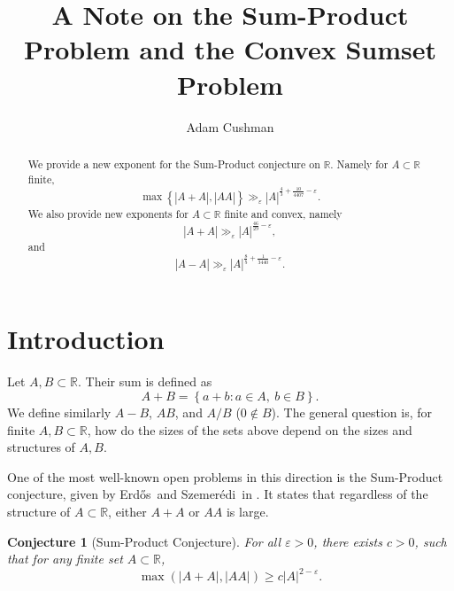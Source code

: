 \documentclass[reqno]{amsart}
\newcommand{\erdos}{Erd{\H{o}}s}
\newcommand{\szemeredi}{Szemer{\'e}di}
\let\epsilon\varepsilon
\numberwithin{equation}{section}
\newtheorem{conjecture}[theorem]{Conjecture}
\begin{document}
\title{A Note on the Sum-Product Problem and the Convex Sumset Problem}

\author{Adam Cushman} \address{Adam Cushman\\ Indiana University Bloomington, USA} 

\begin{abstract}
We provide a new exponent for the Sum-Product conjecture on \(\mathbb{R} \). Namely for \(A \subset \mathbb{R} \) finite,
\[
    \max \left\{ \left\lvert A+A \right\rvert , \left\lvert AA \right\rvert  \right\} \gg_{\epsilon}   \left\lvert A \right\rvert ^{\frac{4}{3} + \frac{10}{4407} - \epsilon} 
.\]
We also provide new exponents for \(A \subset \mathbb{R} \) finite and convex, namely
\[
    \left\lvert A+A \right\rvert \gg_{\epsilon}  \left\lvert A \right\rvert ^{\frac{46}{29} - \epsilon},
\]
and
\[
    \left\lvert A-A \right\rvert \gg_{\epsilon}   \left\lvert A \right\rvert ^{\frac{8}{5} + \frac{1}{3440} -\epsilon}
.\]
\end{abstract}

\maketitle

\section{Introduction}

Let \(A,B \subset \mathbb{R} \). Their sum is defined as
\[
    A + B = \left\{ a + b : a \in A,~ b \in B \right\} 
.\]
We define similarly \(A - B\), \(A B\), and \(A / B\) (\(0 \not \in B\)).
The general question is, for finite \(A,B \subset \mathbb{R} \), how do the sizes of the sets
above depend on the sizes and structures of \(A,B\).

One of the most well-known open problems in this direction is the Sum-Product conjecture,
given by \erdos\ and \szemeredi\ in \cite{erdos-szemeredi}. It states that
regardless of the structure of \(A \subset \mathbb{R} \), either \(A+A\) or \(AA\) is large.

\begin{conjecture}[Sum-Product Conjecture]\label{conj:SP}
For all \(\epsilon > 0\), there exists \(c > 0\), such that for any finite set \(A \subset \mathbb{R} \),
\[
    \max \left( \left\lvert A+A \right\rvert ,\left\lvert AA \right\rvert  \right) \geq c \left\lvert A \right\rvert ^{2 - \epsilon}
.\]
\end{conjecture}
\end{document}
